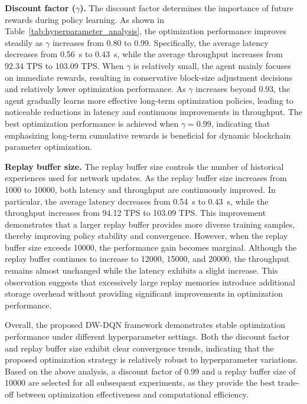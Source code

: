 \documentclass[a4paper,fleqn]{cas-dc}
\begin{document}
\textbf{Discount factor ($\gamma$).}
The discount factor determines the importance of future rewards during policy learning. As shown in Table~\ref{tab:hyperparameter_analysis}, the optimization performance improves steadily as $\gamma$ increases from 0.80 to 0.99. Specifically, the average latency decreases from 0.56~s to 0.43~s, while the average throughput increases from 92.34 TPS to 103.09 TPS. When $\gamma$ is relatively small, the agent mainly focuses on immediate rewards, resulting in conservative block-size adjustment decisions and relatively lower optimization performance. As $\gamma$ increases beyond 0.93, the agent gradually learns more effective long-term optimization policies, leading to noticeable reductions in latency and continuous improvements in throughput. The best optimization performance is achieved when $\gamma=0.99$, indicating that emphasizing long-term cumulative rewards is beneficial for dynamic blockchain parameter optimization.

\textbf{Replay buffer size.}
The replay buffer size controls the number of historical experiences used for network updates. As the replay buffer size increases from 1000 to 10000, both latency and throughput are continuously improved. In particular, the average latency decreases from 0.54~s to 0.43~s, while the throughput increases from 94.12 TPS to 103.09 TPS. This improvement demonstrates that a larger replay buffer provides more diverse training samples, thereby improving policy stability and convergence. However, when the replay buffer size exceeds 10000, the performance gain becomes marginal. Although the replay buffer continues to increase to 12000, 15000, and 20000, the throughput remains almost unchanged while the latency exhibits a slight increase. This observation suggests that excessively large replay memories introduce additional storage overhead without providing significant improvements in optimization performance.

Overall, the proposed DW-DQN framework demonstrates stable optimization performance under different hyperparameter settings. Both the discount factor and replay buffer size exhibit clear convergence trends, indicating that the proposed optimization strategy is relatively robust to hyperparameter variations. Based on the above analysis, a discount factor of 0.99 and a replay buffer size of 10000 are selected for all subsequent experiments, as they provide the best trade-off between optimization effectiveness and computational efficiency.
\end{document}
